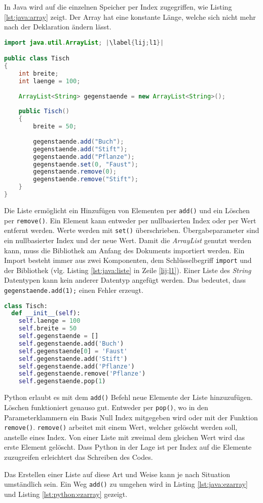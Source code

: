 In Java wird auf die einzelnen Speicher per Index zugegriffen, wie Listing \ref{lst:java:array} zeigt. Der Array hat eine konstante Länge, welche sich nicht mehr nach der Deklaration ändern lässt.
\newpage
\begin{lstlisting}[language=java,caption={Liste in Java},captionpos=b,label={lst:java:liste},frame=none,escapechar=|]
import java.util.ArrayList; |\label{lij;l1}|

public class Tisch
{
    int breite;
    int laenge = 100;
  
    ArrayList<String> gegenstaende = new ArrayList<String>();
  
    public Tisch()
    {
        breite = 50;
    
        gegenstaende.add("Buch");
        gegenstaende.add("Stift");
        gegenstaende.add("Pflanze");
        gegenstaende.set(0, "Faust");
        gegenstaende.remove(0);
        gegenstaende.remove("Stift");
    }
}
\end{lstlisting}

Die Liste ermöglicht ein Hinzufügen von Elementen per \texttt{add()} und ein Löschen per \texttt{remove()}. Ein Element kann entweder per nullbasierten Index oder per Wert entfernt werden. Werte werden mit \texttt{set()} überschrieben. Übergabeparameter sind ein nullbasierter Index und der neue Wert. Damit die \textit{ArrayList} genutzt werden kann, muss die Bibliothek am Anfang des Dokuments importiert werden. Ein Import besteht immer aus zwei Komponenten, dem Schlüsselbegriff \texttt{import}  und der Bibliothek (vlg. Listing \ref{lst:java:liste} in Zeile \ref{lij;l1}). Einer Liste des \textit{String} Datentypen kann kein anderer Datentyp angefügt werden. Das bedeutet, dass \texttt{gegenstaende.add(1);} einen Fehler erzeugt.

\begin{lstlisting}[language=python,caption={Liste in Python},captionpos=b,label={lst:python:liste},frame=none]
class Tisch:
  def __init__(self):
    self.laenge = 100
    self.breite = 50
    self.gegenstaende = []
    self.gegenstaende.add('Buch')
    self.gegenstaende[0] = 'Faust'
    self.gegenstaende.add('Stift')
    self.gegenstaende.add('Pflanze')
    self.gegenstaende.remove('Pflanze')
    self.gegenstaende.pop(1)
\end{lstlisting}

Python erlaubt es mit dem \texttt{add()} Befehl neue Elemente der Liste hinzuzufügen. Löschen funktioniert genauso gut. Entweder per \texttt{pop()}, wo in den Parameterklammern ein Basis Null Index mitgegeben wird oder mit der Funktion \texttt{remove()}. \texttt{remove()} arbeitet mit einem Wert, welcher gelöscht werden soll, anstelle eines Index. Von einer Liste mit zweimal dem gleichen Wert wird das erste Element gelöscht. Dass Python in der Lage ist per Index auf die Elemente zuzugreifen erleichtert das Schreiben des Codes.\par
Das Erstellen einer Liste auf diese Art und Weise kann je nach Situation umständlich sein. Ein Weg \texttt{add()} zu umgehen wird in Listing \ref{lst:java:ezarray} und Listing \ref{lst:python:ezarray} gezeigt.

